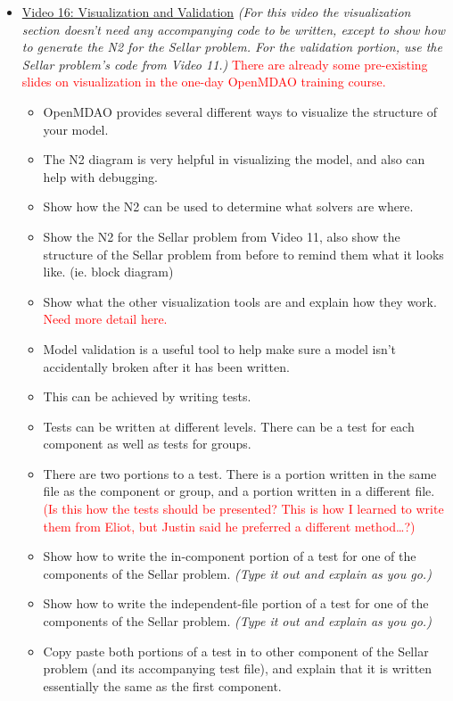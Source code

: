 \documentclass[12pt, letterpaper]{article}
\begin{document}
\begin{itemize}
	\item \underline{Video 16: Visualization and Validation} \textit{(For this video the visualization section doesn’t need any accompanying code to be written, except to show how to generate the N2 for the Sellar problem. For the validation portion, use the Sellar problem’s code from Video 11.)} \textcolor{red}{There are already some pre-existing slides on visualization in the one-day OpenMDAO training course.}
		\begin{itemize}
			\item OpenMDAO provides several different ways to visualize the structure of your model.
			\item The N2 diagram is very helpful in visualizing the model, and also can help with debugging.
			\item Show how the N2 can be used to determine what solvers are where.
			\item Show the N2 for the Sellar problem from Video 11, also show the structure of the Sellar problem from before to remind them what it looks like. (ie. block diagram)
			\item Show what the other visualization tools are and explain how they work. \textcolor{red}{Need more detail here.}
			\item Model validation is a useful tool to help make sure a model isn’t accidentally broken after it has been written.
			\item This can be achieved by writing tests.
			\item Tests can be written at different levels. There can be a test for each component as well as tests for groups. 
			\item There are two portions to a test. There is a portion written in the same file as the component or group, and a portion written in a different file. \textcolor{red}{(Is this how the tests should be presented? This is how I learned to write them from Eliot, but Justin said he preferred a different method…?)}
			\item Show how to write the in-component portion of a test for one of the components of the Sellar problem. \textit{(Type it out and explain as you go.)}
			\item Show how to write the independent-file portion of a test for one of the components of the Sellar problem. \textit{(Type it out and explain as you go.)}
			\item Copy paste both portions of a test in to other component of the Sellar problem (and its accompanying test file), and explain that it is written essentially the same as the first component.

\end{itemize}
\end{itemize}
\end{document}
